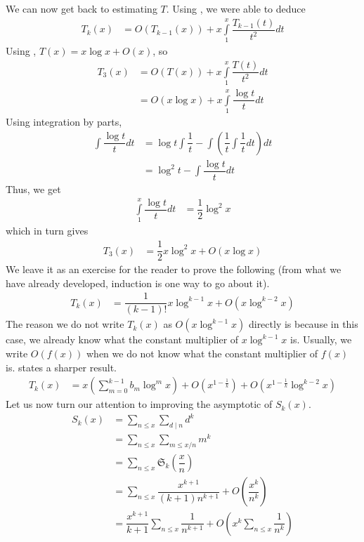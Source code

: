 \documentclass[elemannt.tex]{subfile}
\begin{document}
	We can now get back to estimating $T$. Using , we were able to deduce
		\begin{align*}
			T_{k}(x)
				& = O\left(T_{k-1}(x)\right)+x\int\limits_{1}^{x}\dfrac{T_{k-1}(t)}{t^{2}}dt
		\end{align*}
	Using , $T(x)=x\log{x}+O(x)$, so
		\begin{align*}
			T_{3}(x)
				& = O(T(x))+x\int\limits_{1}^{x}\dfrac{T(t)}{t^{2}}dt\\
				& = O(x\log{x})+x\int\limits_{1}^{x}\dfrac{\log{t}}{t}dt
		\end{align*}
	Using integration by parts,
		\begin{align*}
			\int\dfrac{\log{t}}{t}dt
				& = \log{t}\int\dfrac{1}{t}-\int\left(\dfrac{1}{t}\int\dfrac{1}{t}dt\right)dt\\
				& = \log^{2}{t}-\int\dfrac{\log{t}}{t}dt
		\end{align*}
	Thus, we get
		\begin{align*}
			\int\limits_{1}^{x}\dfrac{\log{t}}{t}dt
				& = \dfrac{1}{2}\log^{2}{x}
		\end{align*}
	which in turn gives
		\begin{align*}
			T_{3}(x)
				& = \dfrac{1}{2}x\log^{2}{x}+O(x\log{x})
		\end{align*}
	We leave it as an exercise for the reader to prove the following (from what we have already developed, induction is one way to go about it).
		\begin{align*}
			T_{k}(x)
				& = \dfrac{1}{(k-1)!}x\log^{k-1}{x}+O\left(x\log^{k-2}{x}\right)
		\end{align*}
	The reason we do not write $T_{k}(x)$ as $O\left(x\log^{k-1}{x}\right)$ directly is because in this case, we already know what the constant multiplier of $x\log^{k-1}{x}$ is. Usually, we write $O(f(x))$ when we do not know what the constant multiplier of $f(x)$ is. \textcite[Page $2$]{landau_1912_0} states a sharper result.
		\begin{align*}
			T_{k}(x)
				& = x\left(\sum_{m=0}^{k-1}b_{m}\log^{m}{x}\right)+O\left(x^{1-\frac{1}{k}}\right)+O\left(x^{1-\frac{1}{k}}\log^{k-2}{x}\right)
		\end{align*}
	Let us now turn our attention to improving the asymptotic of $S_{k}(x)$.
		\begin{align*}
			S_{k}(x)
				& = \sum_{n\leq x}\sum_{d\mid n}d^{k}\\
				& = \sum_{n\leq x}\sum_{m\leq x/n}m^{k}\\
				& = \sum_{n\leq x}\mathfrak{S}_{k}\left(\dfrac{x}{n}\right)\\
				& = \sum_{n\leq x}\dfrac{x^{k+1}}{(k+1)n^{k+1}}+O\left(\dfrac{x^{k}}{n^{k}}\right)\\
				& = \dfrac{x^{k+1}}{k+1}\sum_{n\leq x}\dfrac{1}{n^{k+1}}+O\left(x^{k}\sum_{n\leq x}\dfrac{1}{n^{k}}\right)
		\end{align*}
\end{document}
